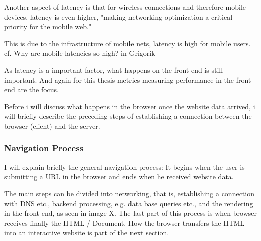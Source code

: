 
Another aspect of latency is that for wireless connections and therefore mobile devices, latency is even higher, "making networking optimization a critical priority for the mobile web." %

This is due to the infrastructure of mobile nets, latency is high for mobile users. cf.  Why are mobile latencies so high? in Grigorik %



As latency is a important factor, what happens on the front end is still important.
And again for this thesis metrics measuring performance in the front end are the focus.

Before i will discuss what happens in the browser once the website data arrived, i will briefly describe the preceding steps of establishing a connection between the browser (client) and the server.











\subsubsection{Navigation Process}

I will explain briefly the general navigation process: It begins when the user is submitting a URL in the browser and ends when he received website data.

The main steps can be divided into networking, that is, establishing a connection with DNS etc., backend processing, e.g. data base queries etc., and the rendering in the front end, as seen in image X.
The last part of this process is when browser receives finally the HTML / Document. 
How the browser transfers the HTML into an interactive website is part of the next section.


